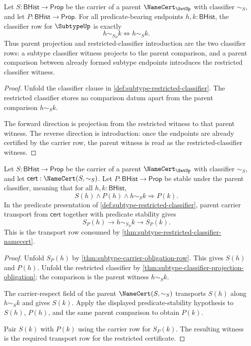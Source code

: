 \begin{theorem}
\label{thm:subtype-classifier-projection-obligation}
Let $S:\mathsf{BHist}\to\mathsf{Prop}$ be the carrier of a parent $\NameCert_{\SetUp}$ with classifier $\sim_S$, and let $P:\mathsf{BHist}\to\mathsf{Prop}$. For all predicate-bearing endpoints $h,k:\mathsf{BHist}$, the classifier row for $\SubtypeUp$ is exactly
$$
h\sim_{S_P}k\Longleftrightarrow h\sim_S k.
$$
Thus parent projection and restricted-classifier introduction are the two classifier rows: a subtype classifier witness projects to the parent comparison, and a parent comparison between already formed subtype endpoints introduces the restricted classifier witness.
\end{theorem}
\begin{proof}
Unfold the classifier clause in \autoref{def:subtype-restricted-classifier}. The restricted classifier stores no comparison datum apart from the parent comparison $h\sim_S k$.

The forward direction is projection from the restricted witness to that parent witness. The reverse direction is introduction: once the endpoints are already certified by the carrier row, the parent witness is read as the restricted-classifier witness.
\end{proof}

\begin{theorem}
\label{thm:subtype-namecert-transport-obligation}
Let $S:\mathsf{BHist}\to\mathsf{Prop}$ be the carrier of a parent $\NameCert_{\SetUp}$ with classifier $\sim_S$, and let $\mathsf{cert}:\NameCert(S,\sim_S)$. Let $P:\mathsf{BHist}\to\mathsf{Prop}$ be stable under the parent classifier, meaning that for all $h,k:\mathsf{BHist}$,
$$
S(h)\land P(h)\land h\sim_S k\Longrightarrow P(k).
$$
In the predicate presentation of \autoref{def:subtype-restricted-classifier}, parent carrier transport from $\mathsf{cert}$ together with predicate stability gives
$$
S_P(h)\to h\sim_{S_P}k\to S_P(k).
$$
This is the transport row consumed by \autoref{thm:subtype-restricted-classifier-namecert}.
\end{theorem}
\begin{proof}
Unfold $S_P(h)$ by \autoref{thm:subtype-carrier-obligation-row}. This gives $S(h)$ and $P(h)$. Unfold the restricted classifier by \autoref{thm:subtype-classifier-projection-obligation}; the comparison is the parent witness $h\sim_S k$.

The carrier-respect field of the parent $\NameCert(S,\sim_S)$ transports $S(h)$ along $h\sim_S k$ and gives $S(k)$. Apply the displayed predicate-stability hypothesis to $S(h)$, $P(h)$, and the same parent comparison to obtain $P(k)$.

Pair $S(k)$ with $P(k)$ using the carrier row for $S_P(k)$. The resulting witness is the required transport row for the restricted certificate.
\end{proof}

